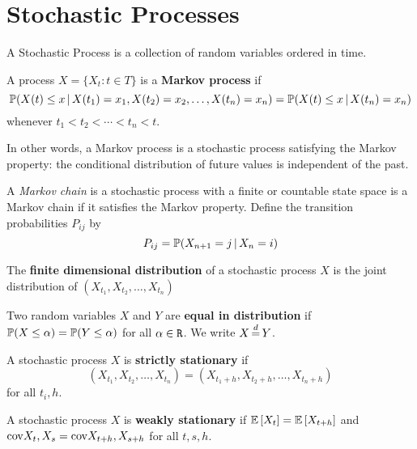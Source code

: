 \documentclass[a4 paper]{article}
\begin{document}
\section{Stochastic Processes} %
A Stochastic Process is a collection of random variables ordered in time. 
\label{sec:stochastic_processes}
\begin{defn}
    A process $X = \{X_t : t \in T\}$ is a \textbf{Markov process} if 
    \[
        \mathbb{P}(X(t) \leq x \, | \, X(t_1) = x_1, X(t_2) = x_2, \dots, X(t_n) = x_n) = \mathbb{P}(X(t) \leq x \, | \, X(t_n) = x_n)
    \]
    whenever $t_1 < t_2 < \cdots < t_n < t$.

    In other words, a Markov process is a stochastic process satisfying the Markov property: the conditional distribution of future values is independent of the past.

\end{defn}


\begin{defn}
    A \emph{Markov chain} is a stochastic process with a finite or countable state space is a Markov chain if it satisfies the Markov property.  Define the transition probabilities $P_{ij}$ by \[
        P_{ij} = \mathbb{P}(X_{n+1} = j \, | \, X_n = i)
    \]
\end{defn}

\begin{defn}
    The \textbf{finite dimensional distribution} of a stochastic process $X$ is the joint distribution of $(X_{t_1}, X_{t_2}, \dots, X_{t_n})$
\end{defn}

\begin{defn}
    Two random variables $X$ and $Y$ are \textbf{equal in distribution} if $\mathbb{P}(X \leq \alpha) = \mathbb{P}(Y \leq \alpha)$ for all $\alpha \in \texttt{R}$.  We write $X \eqd Y$.
\end{defn}

\begin{defn}
    A stochastic process $X$ is \textbf{strictly stationary} if \[
        (X_{t_1}, X_{t_2}, \dots, X_{t_n}) = (X_{t_1+h}, X_{t_2+h}, \dots, X_{t_n+h})
    \] for all $t_i, h$.
\end{defn}

\begin{defn}
    A stochastic process $X$ is \textbf{weakly stationary} if $\mathbb{E}\left[X_t\right] = \mathbb{E}\left[X_{t+h}\right]$ and $\mathrm{cov}{X_t, X_s} = \mathrm{cov}{X_{t+h}, X_{s+h}}$ for all $t, s, h$.
\end{defn}
\end{document}
